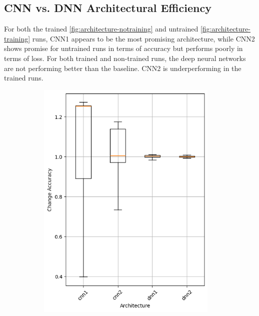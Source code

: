 \subsection{CNN vs. DNN Architectural Efficiency}\label{subsec:cnn-vs.-dnn-architectural-efficiency}
For both the trained \ref{fig:architecture-notraining} and untrained \ref{fig:architecture-training} runs, CNN1 appears to be the most promising architecture, while CNN2 shows promise for untrained runs in terms of accuracy but performs poorly in terms of loss.
For both trained and non-trained runs, the deep neural networks are not performing better than the baseline.
CNN2 is underperforming in the trained runs.
\begin{figure}
    \begin{subfigure}{0.5\textwidth}
        \centering
        \includegraphics[width=0.95\textwidth]{plots/Architecture_NotTrained_accuracy.png}
    \end{subfigure}
    \begin{subfigure}{0.5\textwidth}

\end{subfigure}
\end{figure}
